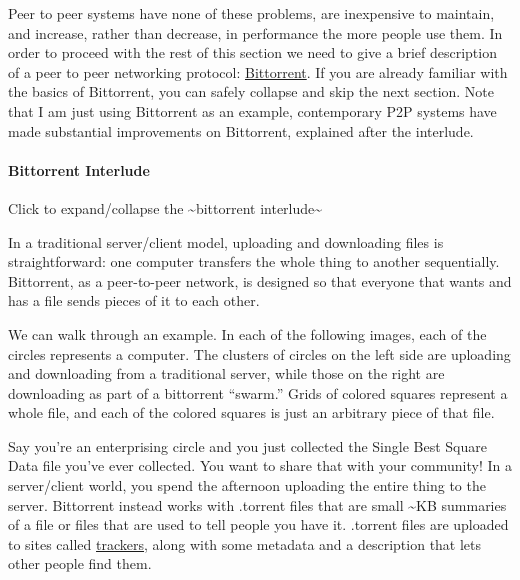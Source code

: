 \documentclass[nohyper]{tufte-book-jls}
\begin{document}
Peer to peer systems have none of these problems, are inexpensive to
maintain, and increase, rather than decrease, in performance the more
people use them. In order to proceed with the rest of this section we
need to give a brief description of a peer to peer networking protocol:
\href{https://en.wikipedia.org/wiki/BitTorrent}{Bittorrent}. If you are
already familiar with the basics of Bittorrent, you can safely collapse
and skip the next section. Note that I am just using Bittorrent as an
example, contemporary P2P systems have made substantial improvements on
Bittorrent, explained
after the interlude.

\hypertarget{bittorrent-interlude}{%
\paragraph{Bittorrent Interlude}\label{bittorrent-interlude}}

Click to expand/collapse the \textasciitilde bittorrent
interlude\textasciitilde{}

In a traditional server/client model, uploading and downloading files is
straightforward: one computer transfers the whole thing to another
sequentially. Bittorrent, as a peer-to-peer network, is designed so that
everyone that wants and has a file sends pieces of it to each other.

We can walk through an example. In each of the following images, each of
the circles represents a computer. The clusters of circles on the left
side are uploading and downloading from a traditional server, while
those on the right are downloading as part of a bittorrent ``swarm.''
Grids of colored squares represent a whole file, and each of the colored
squares is just an arbitrary piece of that file.

Say you're an enterprising circle and you just collected the Single Best
Square Data file you've ever collected. You want to share that with your
community! In a server/client world, you spend the afternoon uploading
the entire thing to the server. Bittorrent instead works with .torrent
files that are small \textasciitilde KB summaries of a
file or files that are used to tell people you have it. .torrent files
are uploaded to sites called
\href{https://en.wikipedia.org/wiki/BitTorrent_tracker}{trackers}, along
with some metadata and a description that lets other people find them.
\end{document}
